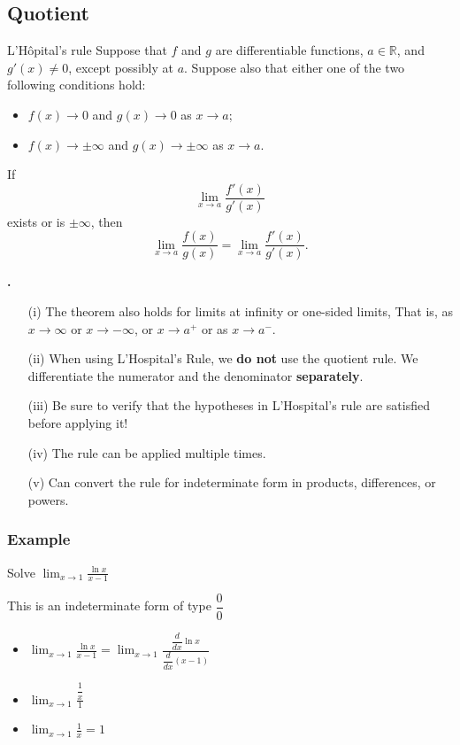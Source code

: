 \documentclass[t]{beamer}
\theoremstyle{plain}
\theoremstyle{definition}
\newcommand{\ds}{\displaystyle}
\newcounter{heading}
\newcommand{\newhead}[1]{\medskip\stepcounter{heading}\noindent\textbf{\hspace{0.2cm}{#1}.}}
\newcommand{\limm}[1]{\displaystyle \lim_{x\to #1}}
\begin{document}
\subsection{Quotient}

\begin{frame}
\begin{block}{L'H\^opital's rule}
Suppose that $f$ and $g$ are differentiable functions, $a \in \mathbb{R}$, and $g'(x) \neq 0$, except possibly at $a$. Suppose also that either one of the two following conditions hold:
\begin{itemize}
\item $f(x)\to0$ and $g(x)\to0$ as $x\to a$;
\item $f(x)\to\pm\infty$ and $g(x)\to\pm\infty$ as $x\to a$.
\end{itemize}
If
\[\limm{a}\frac{f'(x)}{g'(x)}\]
exists or is $\pm \infty$, then
\[\limm{a}\frac{f(x)}{g(x)}=\limm{a}\frac{f'(x)}{g'(x)}.\]
\end{block}


\end{frame}

\begin{frame}
\newhead{Remarks}
\begin{enumerate}
\item[(i)] The theorem also holds for limits at infinity or one-sided limits, That is,  as $x\to\infty$ or $x\to-\infty$, or  $x\to a^+$ or as $x\to a^-$.
\item[(ii)] When using L'Hospital's Rule, we \textbf{do not} use the quotient rule.  We differentiate the numerator and the denominator \textbf{separately}.
\item[(iii)] Be sure to verify that the hypotheses in L'Hospital's rule are satisfied before applying it!
\item[(iv)] The rule can be applied multiple times.
\item[(v)] Can convert the rule for indeterminate form in products, differences, or powers.
\end{enumerate}
\end{frame}


\begin{frame}

\frametitle{Example}

Solve $\limm{1}\ds\frac{\ln x}{x-1}$

This is an indeterminate form of type $\dfrac{0}{0}$  \pause

\begin{itemize}
	\item $\limm{1}\ds\frac{\ln x}{x-1} = \limm{1}\ds\frac{\dfrac{d}{dx}\ln x}{\dfrac{d}{dx}(x-1)}$
	\item $\limm{1}\ds\frac{\dfrac{1}{x}}{1} $
	\item $\limm{1}\ds\frac{1}{x} = 1$
\end{itemize}

\end{frame}
\end{document}
